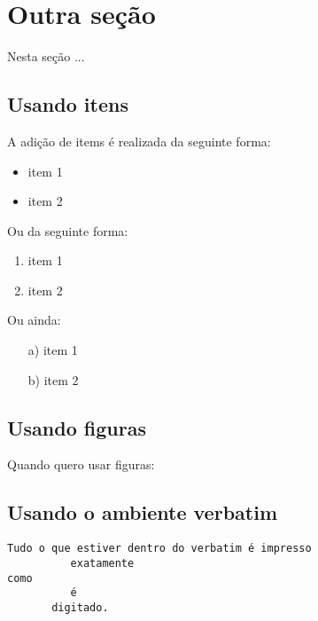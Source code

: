 \section{Outra seção}
Nesta seção ...

\subsection{Usando itens}
A adição de items é realizada da seguinte forma:
\begin{itemize}
\item item 1
\item item 2 
\end{itemize}
Ou da seguinte forma:
\begin{enumerate}
\item item 1
\item item 2 
\end{enumerate}
Ou ainda:
\begin{enumerate}
\item[a)] item 1
\item[b)] item 2 
\end{enumerate}


\subsection{Usando figuras}
Quando quero usar figuras:
\begin{figure}[!h]
  \centering
\end{figure}


\subsection{Usando o ambiente verbatim}
\begin{verbatim}
Tudo o que estiver dentro do verbatim é impresso 
          exatamente 
como
          é
       digitado.
\end{verbatim}
